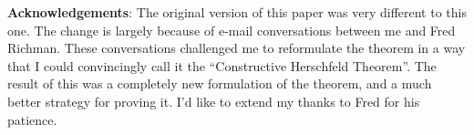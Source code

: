 \documentclass[
]{article}
\theoremstyle{theorem}
\theoremstyle{lemma}
\theoremstyle{corollary}
\theoremstyle{remark}
\theoremstyle{definition}
\begin{document}
\textbf{Acknowledgements}: The original version of this paper was very different to this one. The change is largely because of e-mail conversations between me and Fred Richman. These conversations challenged me to reformulate the theorem in a way that I could convincingly call it the ``Constructive Herschfeld Theorem''. The result of this was a completely new formulation of the theorem, and a much better strategy for proving it. I'd like to extend my thanks to Fred for his patience.


{}

\end{document}
